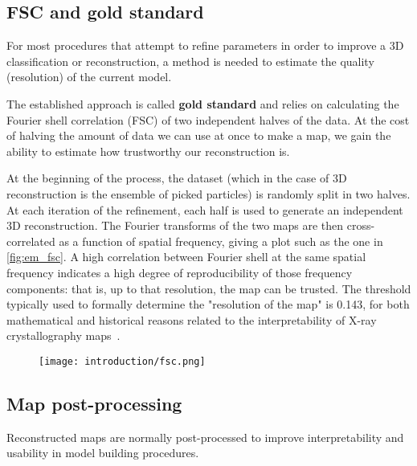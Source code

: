\subsection{FSC and gold standard}\label{em_fsc}
For most procedures that attempt to refine parameters in order to improve a 3D classification or reconstruction, a method is needed to estimate the quality (resolution) of the current model.

The established approach is called \textbf{gold standard} and relies on calculating the Fourier shell correlation (FSC) of two independent halves of the data.
At the cost of halving the amount of data we can use at once to make a map, we gain the ability to estimate how trustworthy our reconstruction is.

At the beginning of the process, the dataset (which in the case of 3D reconstruction is the ensemble of picked particles) is randomly split in two halves.
At each iteration of the refinement, each half is used to generate an independent 3D reconstruction.
The Fourier transforms of the two maps are then cross-correlated as a function of spatial frequency, giving a plot such as the one in \autoref{fig:em_fsc}.
A high correlation between Fourier shell at the same spatial frequency indicates a high degree of reproducibility of those frequency components: that is, up to that resolution, the map can be trusted.
The threshold typically used to formally determine the "resolution of the map" is 0.143, for both mathematical and historical reasons related to the interpretability of X-ray crystallography maps~\cite{rosenthalOptimalDeterminationParticle2003}.

\begin{figure}[ht]
    \centering
    \texttt{[image: introduction/fsc.png]}
    \label{fig:em_fsc}
\end{figure}

\subsection{Map post-processing}
Reconstructed maps are normally post-processed to improve interpretability and usability in model building procedures.

